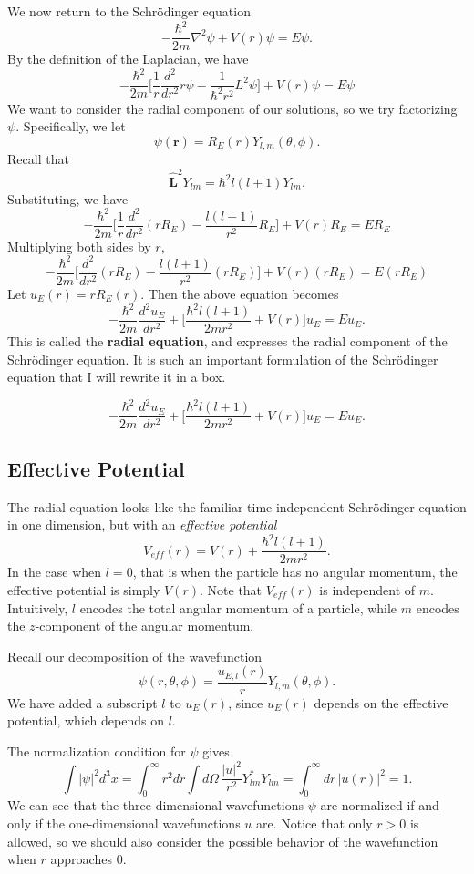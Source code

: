 We now return to the Schrödinger equation $$-\frac{\hbar^2}{2m}\nabla^2\psi+V(r)\psi=E\psi.$$By the definition of the Laplacian, we have $$-\frac{\hbar^2}{2m}\bigg[\frac{1}{r}\frac{d^2}{dr^2}r\psi-\frac{1}{\hbar^2r^2}L^2\psi\bigg]+V(r)\psi=E\psi$$We want to consider the radial component of our solutions, so we try factorizing $\psi$. Specifically, we let $$\psi(\mathbf{r})=R_{E}(r)Y_{l,m}(\theta,\phi).$$Recall that  $$\hat{\mathbf{L}}^2Y_{lm}=\hbar^2l(l+1)Y_{lm}. $$Substituting, we have $$-\frac{\hbar^2}{2m}\bigg[\frac{1}{r}\frac{d^2}{dr^2}(rR_E)-\frac{l(l+1)}{r^2}R_E\bigg]+V(r)R_E=ER_E$$Multiplying both sides by $r$, $$-\frac{\hbar^2}{2m}\bigg[\frac{d^2}{dr^2}(rR_E)-\frac{l(l+1)}{r^2}(rR_E)\bigg]+V(r)(rR_E)=E(rR_E)$$Let $u_E(r)=rR_E(r)$. Then the above equation becomes $$\boxed{-\frac{\hbar^2}{2m}\frac{d^2u_E}{dr^2}+\bigg[\frac{\hbar^2l(l+1)}{2mr^2}+V(r)\bigg]u_E=Eu_E.}$$This is called the \textbf{radial equation}, and expresses the radial component of the Schrödinger equation. It is such an important formulation of the Schrödinger equation that I will rewrite it in a box.

\begin{framedthm}
    $$-\frac{\hbar^2}{2m}\frac{d^2u_E}{dr^2}+\bigg[\frac{\hbar^2l(l+1)}{2mr^2}+V(r)\bigg]u_E=Eu_E.$$
\end{framedthm}

\subsection{Effective Potential}\label{effective_potential}

The radial equation looks like the familiar time-independent Schrödinger equation in one dimension, but with an \textit{effective potential} $$V_{eff}(r)=V(r)+\frac{\hbar^2l(l+1)}{2mr^2}.$$In the case when $l=0$, that is when the particle has no angular momentum, the effective potential is simply $V(r)$. Note that $V_{eff}(r)$ is independent of $m$. Intuitively, $l$ encodes the total angular momentum of a particle, while $m$ encodes the $z$-component of the angular momentum.

Recall our decomposition of the wavefunction $$\psi(r,\theta,\phi)=\frac{u_{E,l}(r)}{r}Y_{l,m}(\theta,\phi).$$We have added a subscript $l$ to $u_E(r)$, since $u_E(r)$ depends on the effective potential, which depends on $l$.

The normalization condition for $\psi$ gives $$\int|\psi|^2d^3x=\int_0^\infty r^2dr\int d\Omega\, \frac{|u|^2}{r^2}Y_{lm}^*Y_{lm}=\int_0^\infty dr\,|u(r)|^2=1.$$We can see that the three-dimensional wavefunctions $\psi$ are normalized if and only if the one-dimensional wavefunctions $u$ are. Notice that only $r>0$ is allowed, so we should also consider the possible behavior of the wavefunction when $r$ approaches $0$.

